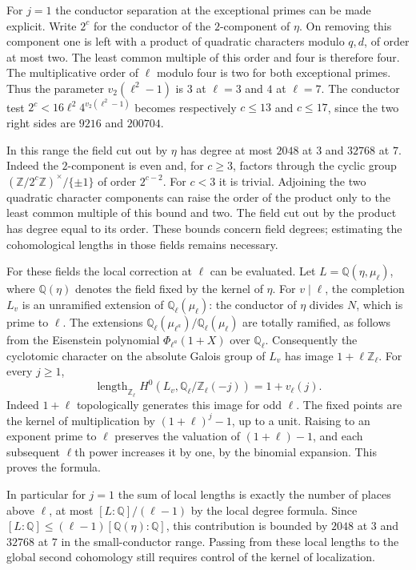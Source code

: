 \documentclass[11pt]{amsart}
\theoremstyle{definition}
\theoremstyle{remark}
\begin{document}
For $j=1$ the conductor separation at the exceptional primes can be
made explicit. Write $2^c$ for the conductor of the $2$-component
of $\eta$. On removing this component one is left with a product of
quadratic characters modulo $q,d$, of order at most two. The least
common multiple of this order and four is therefore four. The
multiplicative order of $\ell$ modulo four is two for both exceptional
primes. Thus the parameter $v_2(\ell^2-1)$ is $3$ at $\ell=3$ and
$4$ at $\ell=7$. The conductor test
$2^c<16\ell^2 4^{v_2(\ell^2-1)}$ becomes respectively
$c\le13$ and $c\le17$, since the two right sides are $9216$ and
$200704$.

In this range the field cut out by $\eta$ has degree at most $2048$
at $3$ and $32768$ at $7$. Indeed the $2$-component is even and, for
$c\ge3$, factors through the cyclic group
$(\mathbb Z/2^c\mathbb Z)^\times/\{\pm1\}$ of order $2^{c-2}$.
For $c<3$ it is trivial. Adjoining the two quadratic character
components can raise the order of the product only to the least common
multiple of this bound and two. The field cut out by the product has
degree equal to its order. These bounds concern field degrees;
estimating the cohomological lengths in those fields remains necessary.

For these fields the local correction at $\ell$ can be evaluated.
Let $L=\mathbb Q(\eta,\mu_\ell)$, where $\mathbb Q(\eta)$ denotes the
field fixed by the kernel of $\eta$. For $v\mid\ell$, the completion
$L_v$ is an unramified extension of $\mathbb Q_\ell(\mu_\ell)$:
the conductor of $\eta$ divides $N$, which is prime to $\ell$.
The extensions $\mathbb Q_\ell(\mu_{\ell^a})/
\mathbb Q_\ell(\mu_\ell)$ are totally ramified, as follows from the
Eisenstein polynomial $\Phi_{\ell^a}(1+X)$ over $\mathbb Q_\ell$.
Consequently the cyclotomic character on the absolute Galois group
of $L_v$ has image $1+\ell\mathbb Z_\ell$. For every $j\ge1$,
\[
 \operatorname{length}_{\mathbb Z_\ell}
  H^0(L_v,\mathbb Q_\ell/\mathbb Z_\ell(-j))=1+v_\ell(j).
\]
Indeed $1+\ell$ topologically generates this image for odd $\ell$.
The fixed points are the kernel of multiplication by $(1+\ell)^j-1$,
up to a unit. Raising to an exponent prime to $\ell$ preserves the
valuation of $(1+\ell)-1$, and each subsequent $\ell$th power
increases it by one, by the binomial expansion. This proves the formula.

In particular for $j=1$ the sum of local lengths is exactly the number
of places above $\ell$, at most $[L:\mathbb Q]/(\ell-1)$ by the local
degree formula. Since $[L:\mathbb Q]\le(\ell-1)[\mathbb Q(\eta):\mathbb Q]$,
this contribution is bounded by $2048$ at $3$ and $32768$ at $7$
in the small-conductor range. Passing from these local lengths to the
global second cohomology still requires control of the kernel of
localization.
\end{document}
